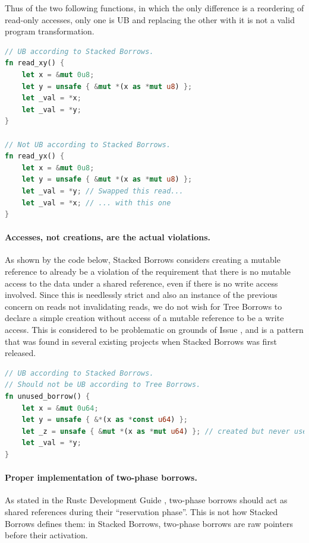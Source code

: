 \documentclass[a4paper,11pt]{article}
\theoremstyle{plain}
\theoremstyle{definition}
\theoremstyle{remark}
\begin{document}
Thus of the two following functions, in which the only difference is a reordering
of read-only accesses, only one is UB and replacing the other with it is not
a valid program transformation.
\begin{lstlisting}[language=rust]
// UB according to Stacked Borrows.
fn read_xy() {
    let x = &mut 0u8;
    let y = unsafe { &mut *(x as *mut u8) };
    let _val = *x;
    let _val = *y;
}

// Not UB according to Stacked Borrows.
fn read_yx() {
    let x = &mut 0u8;
    let y = unsafe { &mut *(x as *mut u8) };
    let _val = *y; // Swapped this read...
    let _val = *x; // ... with this one
}
\end{lstlisting}

\paragraph*{Accesses, not creations, are the actual violations.}
As shown by the code below, Stacked Borrows considers creating a mutable reference
to already be a violation of the requirement that there is no mutable access to
the data under a shared reference, even if there is no write access involved.
Since this is needlessly strict and also an instance of the previous concern on
reads not invalidating reads, we do not wish for Tree Borrows to declare a simple
creation without access of a mutable reference to be a write access.
This is considered to be problematic on grounds of
Issue \cite{issue_uniqueness_early}, and is a pattern that was found in
several existing projects when Stacked Borrows was first released.
\begin{lstlisting}[language=rust]
// UB according to Stacked Borrows.
// Should not be UB according to Tree Borrows.
fn unused_borrow() {
    let x = &mut 0u64;
    let y = unsafe { &*(x as *const u64) };
    let _z = unsafe { &mut *(x as *mut u64) }; // created but never used
    let _val = *y;
}
\end{lstlisting}

\paragraph*{Proper implementation of two-phase borrows.}
As stated in the Rustc Development Guide \cite{rustc_dev_guide},
two-phase borrows should act as shared references during their ``reservation phase''.
This is not how Stacked Borrows defines them: in Stacked Borrows,
two-phase borrows are raw pointers before their activation.
\end{document}
